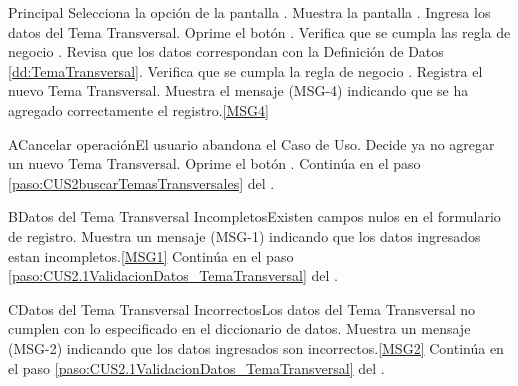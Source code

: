 	\begin{UCtrayectoria}{Principal}
			\UCpaso[\UCactor] Selecciona la opción  de la pantalla .
			\UCpaso Muestra la pantalla .
			\UCpaso [\UCactor] Ingresa los datos del Tema Transversal.  \label{paso:CUS2.1ValidacionDatos_TemaTransversal}
			\UCpaso [\UCactor] Oprime el botón .
			\UCpaso Verifica que se cumpla las regla de negocio .  
			\UCpaso Revisa que los datos correspondan con la Definición de Datos \ref{dd:TemaTransversal}. 
			\UCpaso Verifica que se cumpla la regla de negocio .  
			\UCpaso Registra el nuevo Tema Transversal.
			\UCpaso Muestra el mensaje (MSG-4) indicando que se ha agregado correctamente el registro.\ref{MSG4}
	\end{UCtrayectoria}

	\begin{UCtrayectoriaA}{A}{Cancelar operación}{El usuario abandona el Caso de Uso.}
			\UCpaso[\UCactor] Decide ya no agregar un nuevo Tema Transversal.
			\UCpaso[\UCactor] Oprime el botón .
			\UCpaso Continúa en el paso \ref{paso:CUS2buscarTemasTransversales} del .
	\end{UCtrayectoriaA}
		
	\begin{UCtrayectoriaA}{B}{Datos del Tema Transversal Incompletos}{Existen campos nulos en el formulario de registro.}
			\UCpaso Muestra un mensaje (MSG-1) indicando que los datos ingresados estan incompletos.\ref{MSG1}
			\UCpaso Continúa en el paso \ref{paso:CUS2.1ValidacionDatos_TemaTransversal} del .
	\end{UCtrayectoriaA}

	\begin{UCtrayectoriaA}{C}{Datos del Tema Transversal Incorrectos}{Los datos del Tema Transversal no cumplen con lo especificado en el diccionario de datos.}
			\UCpaso Muestra un mensaje (MSG-2) indicando que los datos ingresados son incorrectos.\ref{MSG2}
			\UCpaso Continúa en el paso \ref{paso:CUS2.1ValidacionDatos_TemaTransversal} del .
	\end{UCtrayectoriaA}

